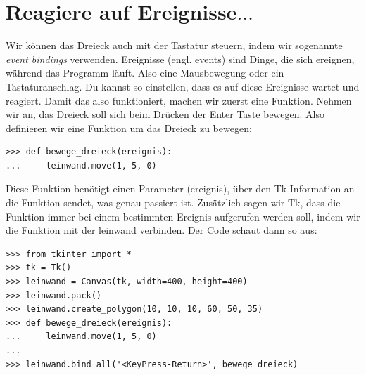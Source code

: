 \section{Reagiere auf Ereignisse\texorpdfstring{$\ldots$}{...}}

Wir können das Dreieck auch mit der Tastatur steuern, indem wir sogenannte \emph{event bindings} verwenden. Ereignisse (engl. events) sind Dinge, die sich ereignen, während das Programm läuft. Also eine Mausbewegung oder ein Tastaturanschlag. Du kannst  so einstellen, dass es auf diese Ereignisse wartet und reagiert. Damit das also funktioniert, machen wir zuerst eine Funktion. Nehmen wir an, das Dreieck soll sich beim Drücken der Enter Taste bewegen. Also definieren wir eine Funktion um das Dreieck zu bewegen:

\begin{Verbatim}[frame=single]
>>> def bewege_dreieck(ereignis):
...     leinwand.move(1, 5, 0)
\end{Verbatim}

Diese Funktion benötigt einen Parameter (ereignis), über den Tk Information an die Funktion sendet, was genau passiert ist. Zusätzlich sagen wir Tk, dass die Funktion immer bei einem bestimmten Ereignis aufgerufen werden soll, indem wir die  Funktion mit der leinwand verbinden. Der Code schaut dann so aus:

\begin{Verbatim}[frame=single]
>>> from tkinter import *
>>> tk = Tk()
>>> leinwand = Canvas(tk, width=400, height=400)
>>> leinwand.pack()
>>> leinwand.create_polygon(10, 10, 10, 60, 50, 35)
>>> def bewege_dreieck(ereignis):
...     leinwand.move(1, 5, 0)
...
>>> leinwand.bind_all('<KeyPress-Return>', bewege_dreieck)
\end{Verbatim}

